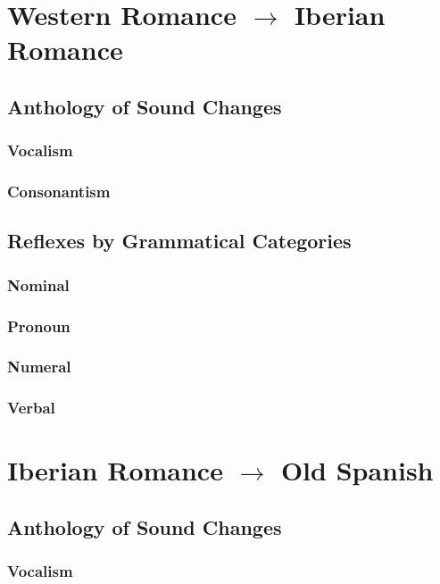 \documentclass{report}
\begin{document}
\chapter{Western Romance $\rightarrow$ Iberian Romance}

\section{Anthology of Sound Changes}

\subsection{Vocalism}

\subsection{Consonantism}

\section{Reflexes by Grammatical Categories}

\subsection{Nominal}

\subsection{Pronoun}

\subsection{Numeral}

\subsection{Verbal}

\chapter{Iberian Romance $\rightarrow$ Old Spanish}

\section{Anthology of Sound Changes}

\subsection{Vocalism}
\end{document}
